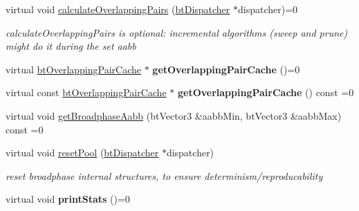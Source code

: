 \begin{DoxyCompactItemize}
\item 
\mbox{\label{classbtBroadphaseInterface_a27e29cb6fd31e5fe626e7ba973e67ddb}} 
virtual void \hyperlink{classbtBroadphaseInterface_a27e29cb6fd31e5fe626e7ba973e67ddb}{calculate\+Overlapping\+Pairs} (\hyperlink{classbtDispatcher}{bt\+Dispatcher} $\ast$dispatcher)=0
\begin{DoxyCompactList}\small\item\em calculate\+Overlapping\+Pairs is optional\+: incremental algorithms (sweep and prune) might do it during the set aabb \end{DoxyCompactList}\item 
\mbox{\label{classbtBroadphaseInterface_ab571b271322bd5a114fe737b30df5b52}} 
virtual \hyperlink{classbtOverlappingPairCache}{bt\+Overlapping\+Pair\+Cache} $\ast$ {\bfseries get\+Overlapping\+Pair\+Cache} ()=0
\item 
\mbox{\label{classbtBroadphaseInterface_a80c39996491df3b0a5bf927d5837c966}} 
virtual const \hyperlink{classbtOverlappingPairCache}{bt\+Overlapping\+Pair\+Cache} $\ast$ {\bfseries get\+Overlapping\+Pair\+Cache} () const =0
\item 
virtual void \hyperlink{classbtBroadphaseInterface_ab5af9e26414f5a72a76040b8fab4d9e2}{get\+Broadphase\+Aabb} (bt\+Vector3 \&aabb\+Min, bt\+Vector3 \&aabb\+Max) const =0
\item 
\mbox{\label{classbtBroadphaseInterface_a8135b10b29bced0b1c62ba6be060dc29}} 
virtual void \hyperlink{classbtBroadphaseInterface_a8135b10b29bced0b1c62ba6be060dc29}{reset\+Pool} (\hyperlink{classbtDispatcher}{bt\+Dispatcher} $\ast$dispatcher)
\begin{DoxyCompactList}\small\item\em reset broadphase internal structures, to ensure determinism/reproducability \end{DoxyCompactList}\item 
\mbox{\label{classbtBroadphaseInterface_aa8aa8cfee6492f59c54ca1827a072554}} 
virtual void {\bfseries print\+Stats} ()=0
\item 
\mbox{\label{classbtBroadphaseInterface_abf0cb7dc11f672c4b5d65ef3eee6b77d}} 

\end{DoxyCompactItemize}
